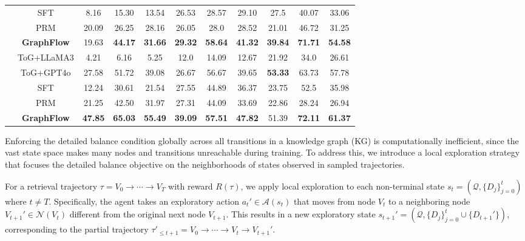 \begin{table}[t]
{\begin{tabular}{c|c|ccc|ccc|ccc}
          & SFT   &  8.16     &   15.30    &   13.54    &   26.53    &   28.57    &   29.10    &   27.5    &   40.07    & 33.06 \\
          & PRM   &   20.09  &  26.25  &   	28.16     &   26.05	  &  28.0 &   28.52	   &  21.01 &  46.72& 31.25   \\
          & \textbf{GraphFlow} &  19.63&  \textbf{44.17}& 	\textbf{31.66}   & \textbf{29.32}	& \textbf{58.64}	&\textbf{41.32}	 &  \textbf{39.84}& 	\textbf{71.71}	& \textbf{54.58}    \\
    \midrule
     & ToG+LLaMA3 &4.21     &   6.16   &   5.25    &   12.0    &   14.09    &   12.67    &   21.92    &   34.0    & 26.61 \\
          & ToG+GPT4o &27.58& 	51.72& 	39.08& 	26.67& 	56.67& 	39.65& 	\textbf{53.33}& 	63.73& 	57.78 \\
          & SFT & 12.24&	30.61	&21.54	&27.55&	44.89&	36.37&	23.75&	52.5&	35.98 \\
          & PRM  &  21.25	 & 42.50 & 	31.97 & 	27.31 & 	44.09 & 	33.69 &  22.86 & 	28.24 & 	26.94 \\
          & \textbf{GraphFlow} &  \textbf{47.85}& 	\textbf{65.03}& 	\textbf{55.49}& 	\textbf{39.09}& 	\textbf{57.51}& 	\textbf{47.82}& 	51.39& 	\textbf{72.11}& 	\textbf{61.37} \\
    \bottomrule
    \end{tabular}}%
    \vspace{-0.6cm}
  \label{tab:performance-retrieval-acc}%
\end{table}%



Enforcing the detailed balance condition globally across all transitions in a knowledge graph (KG) is computationally inefficient, since the vast state space makes many nodes and transitions unreachable during training. 
To address this, we introduce a local exploration strategy that focuses the detailed balance objective on the neighborhoods of states observed in sampled trajectories.


For a retrieval trajectory $\tau = V_{0} \rightarrow \cdots \rightarrow V_{T}$ with reward $R(\tau)$, we apply local exploration to each non-terminal state $s_{t} = (\mathcal{Q}, \{D_{j}\}_{j=0}^{t})$ where $t \ne T$. 
Specifically, the agent takes an exploratory action $a_{t}' \in \mathcal{A}(s_{t})$ that moves from node $V_t$ to a neighboring node $V_{t+1}' \in \mathcal{N}(V_t)$ different from the original next node $V_{t+1}$. 
This results in a new exploratory state $s_{t+1}' = (\mathcal{Q}, \{D_{j}\}_{j=0}^{t} \cup \{D_{t+1}'\})$, corresponding to the partial trajectory $\tau'_{\leq t+1} = V_{0} \rightarrow \cdots \rightarrow V_{t} \rightarrow V_{t+1}'$.

